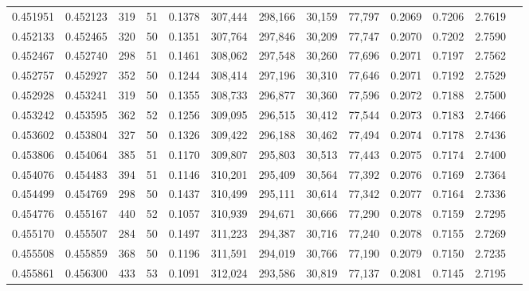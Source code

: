 \begin{tabular}{rrrrrrrrrrrrr}
0.451951 & 0.452123 &   319 &  51 &                                     0.1378 & 307,444 & 298,166 &  30,159 &  77,797 & 0.2069 & 0.7206 & 2.7619 \\
0.452133 & 0.452465 &   320 &  50 &                                     0.1351 & 307,764 & 297,846 &  30,209 &  77,747 & 0.2070 & 0.7202 & 2.7590 \\
0.452467 & 0.452740 &   298 &  51 &                                     0.1461 & 308,062 & 297,548 &  30,260 &  77,696 & 0.2071 & 0.7197 & 2.7562 \\
0.452757 & 0.452927 &   352 &  50 &                                     0.1244 & 308,414 & 297,196 &  30,310 &  77,646 & 0.2071 & 0.7192 & 2.7529 \\
0.452928 & 0.453241 &   319 &  50 &                                     0.1355 & 308,733 & 296,877 &  30,360 &  77,596 & 0.2072 & 0.7188 & 2.7500 \\
0.453242 & 0.453595 &   362 &  52 &                                     0.1256 & 309,095 & 296,515 &  30,412 &  77,544 & 0.2073 & 0.7183 & 2.7466 \\
0.453602 & 0.453804 &   327 &  50 &                                     0.1326 & 309,422 & 296,188 &  30,462 &  77,494 & 0.2074 & 0.7178 & 2.7436 \\
0.453806 & 0.454064 &   385 &  51 &                                     0.1170 & 309,807 & 295,803 &  30,513 &  77,443 & 0.2075 & 0.7174 & 2.7400 \\
0.454076 & 0.454483 &   394 &  51 &                                     0.1146 & 310,201 & 295,409 &  30,564 &  77,392 & 0.2076 & 0.7169 & 2.7364 \\
0.454499 & 0.454769 &   298 &  50 &                                     0.1437 & 310,499 & 295,111 &  30,614 &  77,342 & 0.2077 & 0.7164 & 2.7336 \\
0.454776 & 0.455167 &   440 &  52 &                                     0.1057 & 310,939 & 294,671 &  30,666 &  77,290 & 0.2078 & 0.7159 & 2.7295 \\
0.455170 & 0.455507 &   284 &  50 &                                     0.1497 & 311,223 & 294,387 &  30,716 &  77,240 & 0.2078 & 0.7155 & 2.7269 \\
0.455508 & 0.455859 &   368 &  50 &                                     0.1196 & 311,591 & 294,019 &  30,766 &  77,190 & 0.2079 & 0.7150 & 2.7235 \\
0.455861 & 0.456300 &   433 &  53 &                                     0.1091 & 312,024 & 293,586 &  30,819 &  77,137 & 0.2081 & 0.7145 & 2.7195 \\

\end{tabular}
